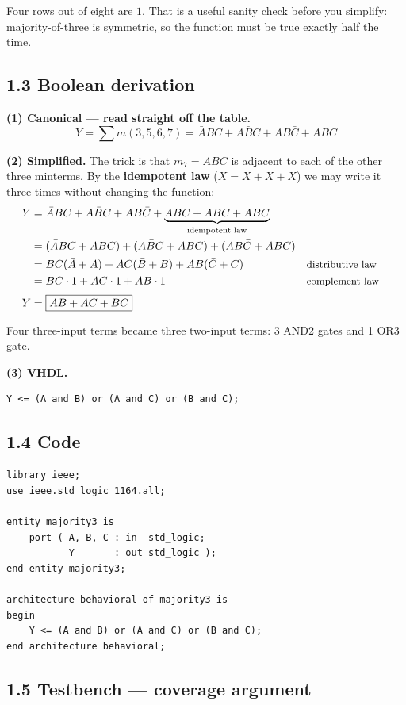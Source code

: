 \documentclass[11pt]{article}
\begin{document}
Four rows out of eight are $1$. That is a useful sanity check before you simplify:
majority-of-three is symmetric, so the function must be true exactly half the time.

\subsection*{1.3 Boolean derivation}

\textbf{(1) Canonical --- read straight off the table.}
\[
Y = \sum m(3,5,6,7) = \bar{A}BC + A\bar{B}C + AB\bar{C} + ABC
\]

\textbf{(2) Simplified.} The trick is that $m_7 = ABC$ is adjacent to each of the
other three minterms. By the \textbf{idempotent law} ($X = X + X + X$) we may write
it three times without changing the function:
\begin{align*}
Y &= \bar{A}BC + A\bar{B}C + AB\bar{C} + \underbrace{ABC + ABC + ABC}_{\text{idempotent law}} \\
  &= (\bar{A}BC + ABC) + (A\bar{B}C + ABC) + (AB\bar{C} + ABC) \\
  &= BC(\bar{A} + A) + AC(\bar{B} + B) + AB(\bar{C} + C) && \text{\small distributive law} \\
  &= BC \cdot 1 + AC \cdot 1 + AB \cdot 1 && \text{\small complement law} \\[2pt]
Y &= \boxed{AB + AC + BC}
\end{align*}

Four three-input terms became three two-input terms: 3 AND2 gates and 1 OR3 gate.

\textbf{(3) VHDL.}
\begin{lstlisting}
Y <= (A and B) or (A and C) or (B and C);
\end{lstlisting}

\subsection*{1.4 Code}

\begin{lstlisting}
library ieee;
use ieee.std_logic_1164.all;

entity majority3 is
    port ( A, B, C : in  std_logic;
           Y       : out std_logic );
end entity majority3;

architecture behavioral of majority3 is
begin
    Y <= (A and B) or (A and C) or (B and C);
end architecture behavioral;
\end{lstlisting}

\subsection*{1.5 Testbench --- coverage argument}
\end{document}
